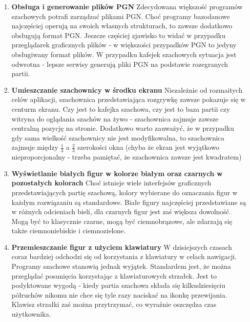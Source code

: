 \documentclass[12pt,leqno]{article}
\begin{document}
\begin{enumerate}

\item{\bf Obsługa i generowanie plików PGN}
Zdecydowana większość programów szachowych potrafi zarządzać plikami PGN. Choć programy bazodanowe najczęściej operują na swoich własnych strukturach, to zawsze dodatkowo obsługują format PGN. Jeszcze częściej zjawisko to widać w przypadku przeglądarek graficznych plików - w większości przypadków PGN to jedyny obsługiwany format plików. W przypadku kafejek szachowych sytuacja jest odwrotna - lepsze serwisy generują pliki PGN na podstawie rozegranych partii. 


\item  {\bf Umieszczanie szachownicy w środku ekranu}
Niezależnie od rozmaitych celów aplikacji, szachownica przedstawiająca rozgrywkę zawsze pokazuje się w centurm ekranu. Czy jest to kafejka szachowa, czy jest to baza partii czy witryna do oglądania szachów na żywo - szachownica zajmuje zawsze centralną pozycję na stronie. Dodatkowo warto zauważyć, że w przypadku gdy sama wielkość szachownicy nie jest modyfikowalna, to szachownica zajmuje między $\frac{1}{3}$ a $\frac{2}{3}$ szerokości okna (chyba że ekran jest wyjątkowo nieproporcjonalny - trzeba pamiętać, że szachownica zawsze jest kwadratem)

 \item {\bf Wyświetlanie białych figur w kolorze białym oraz czarnych w pozostałych kolorach}
Choć istnieje wiele interfejsów graficznych przedstawiających partię szachową, kolory wybierane do oznaczania figur w każdym rozwiązaniu są standardowe. Białe figury najczęściej przedstawiane są w różnych odcieniach bieli, dla czarnych figur jest zaś większa dowolność. Mogą być to klasycznie czarne, mogą być ciemnobrązowe, ale zdarzają się także ciemnoniebiskie i ciemnozielone. 

\item{\bf Przemieszczanie figur z użyciem klawiatury}
W dzisiejszych czasach coraz bardziej odchodzi się od korzystania z klawiatury w celach nawigacji. Programy szachowe stanowią jednak wyjątek. Standardem jest, że można przeglądać posunięcia korzystając z klawiaturowych strzałek. Jest to podyktowane wygodą - kiedy partia szachowa składa się kilkudziesięciu półruchów nikomu nie chce się tyle razy naciskać na ikonkę przewijania. Klawisz strzałki zaś można przytrzymać, co wyraźnie oszczędza czas użytkownika.


\end{enumerate}
\end{document}
